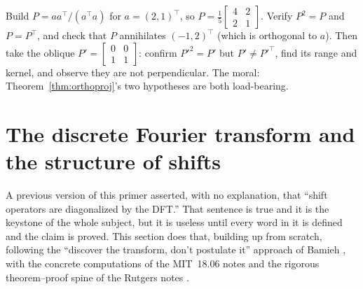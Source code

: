\begin{problem}
\label{prob:proj}
Build $P = a a^\top / (a^\top a)$ for $a = (2,1)^\top$, so $P = \tfrac15
\left[\begin{smallmatrix} 4 & 2 \\ 2 & 1 \end{smallmatrix}\right]$. Verify $P^2 = P$
and $P = P^\top$, and check that $P$ annihilates $(-1,2)^\top$ (which is orthogonal to
$a$). Then take the oblique $P' = \left[\begin{smallmatrix} 0 & 0 \\ 1 & 1
\end{smallmatrix}\right]$: confirm $P'^2 = P'$ but $P' \neq P'^\top$, find its range
and kernel, and observe they are not perpendicular. The moral: Theorem~\ref{thm:orthoproj}'s
two hypotheses are both load-bearing.
\end{problem}


\section{The discrete Fourier transform and the structure of shifts}
\label{sec:dft}

A previous version of this primer asserted, with no explanation, that ``shift operators
are diagonalized by the DFT.'' That sentence is true and it is the keystone of the
whole subject, but it is useless until every word in it is defined and the claim is
proved. This section does that, building up from scratch, following the
``discover the transform, don't postulate it'' approach of Bamieh
\citep{fourier_bamieh}, with the concrete computations of the MIT~18.06 notes
\citep{fourier_mit1806} and the rigorous theorem--proof spine of the Rutgers notes
\citep{fourier_rutgers}.

